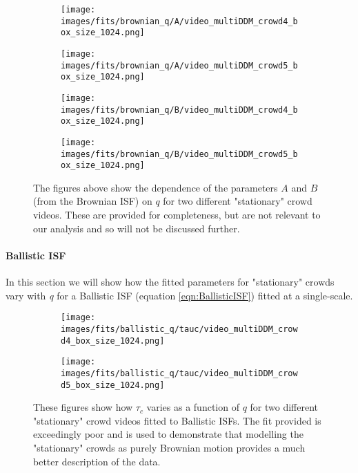 \documentclass[10pt]{article}
\begin{document}
\begin{figure}[H]
\begin{subfigure}[t]{.5\textwidth}
  \centering
  \texttt{[image: images/fits/brownian\_q/A/video\_multiDDM\_crowd4\_box\_size\_1024.png]}
  \caption{}
\end{subfigure}%
\hfill
\begin{subfigure}[t]{.5\textwidth}
  \centering
  \texttt{[image: images/fits/brownian\_q/A/video\_multiDDM\_crowd5\_box\_size\_1024.png]}
  \caption{}
\end{subfigure}
\label{fig:crowd_brownian_fits_A}
\par\bigskip
\begin{subfigure}[t]{.5\textwidth}
  \centering
  \texttt{[image: images/fits/brownian\_q/B/video\_multiDDM\_crowd4\_box\_size\_1024.png]}
  \caption{}
\end{subfigure}%
\hfill
\begin{subfigure}[t]{.5\textwidth}
  \centering
  \texttt{[image: images/fits/brownian\_q/B/video\_multiDDM\_crowd5\_box\_size\_1024.png]}
  \caption{}
\end{subfigure}
\caption{The figures above show the dependence of the parameters $A$ and $B$ (from the Brownian ISF) on $q$ for two different "stationary" crowd videos. These are provided for completeness, but are not relevant to our analysis and so will not be discussed further.}
\label{fig:crowd_brownian_fits_B}
\end{figure}


\paragraph{Ballistic ISF}

In this section we will show how the fitted parameters for "stationary" crowds vary with \textit{q} for a Ballistic ISF (equation \ref{eqn:BallisticISF}) fitted at a single-scale.

\begin{figure}[H]
\begin{subfigure}[t]{.5\textwidth}
  \centering
  \texttt{[image: images/fits/ballistic\_q/tauc/video\_multiDDM\_crowd4\_box\_size\_1024.png]}
  \caption{}
\end{subfigure}%
\hfill
\begin{subfigure}[t]{.5\textwidth}
  \centering
  \texttt{[image: images/fits/ballistic\_q/tauc/video\_multiDDM\_crowd5\_box\_size\_1024.png]}
  \caption{}
\end{subfigure}
\caption{These figures show how $\tau_c$ varies as a function of $q$ for two different "stationary" crowd videos fitted to Ballistic ISFs. The fit provided is exceedingly poor and is used to demonstrate that modelling the "stationary" crowds as purely Brownian motion provides a much better description of the data.}
\label{fig:crowd_ballistic_fits_tauc}
\end{figure}
\end{document}
